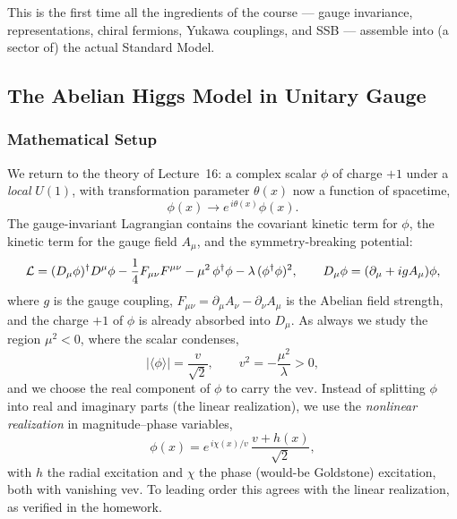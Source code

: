 This is the first time all the ingredients of the course --- gauge invariance, representations, chiral fermions, Yukawa couplings, and SSB --- assemble into (a sector of) the actual Standard Model.

\subsection{\texorpdfstring{The Abelian Higgs Model in Unitary Gauge}{The Abelian Higgs Model in Unitary Gauge}}\label{subsec:lec17:abelian-higgs}

\subsubsection*{Mathematical Setup}

We return to the theory of Lecture~16: a complex scalar $\phi$ of charge $+1$ under a \emph{local} $U(1)$, with transformation parameter $\theta(x)$ now a function of spacetime,
\begin{equation}
  \phi(x)\to e^{\,i\theta(x)}\phi(x) .
  \label{eq:lec17:u1_transformation}
\end{equation}
The gauge-invariant Lagrangian contains the covariant kinetic term for $\phi$, the kinetic term for the gauge field $A_\mu$, and the symmetry-breaking potential:
\begin{equation}
  \mathcal{L}
  =(D_\mu\phi)^\dagger D^\mu\phi
   -\frac14 F_{\mu\nu}F^{\mu\nu}
   -\mu^2\,\phi^\dagger\phi
   -\lambda\,(\phi^\dagger\phi)^2 ,
  \qquad
  D_\mu\phi=(\partial_\mu+i g A_\mu)\phi ,
  \label{eq:lec17:abelian_lagrangian}
\end{equation}
where $g$ is the gauge coupling, $F_{\mu\nu}=\partial_\mu A_\nu-\partial_\nu A_\mu$ is the Abelian field strength, and the charge $+1$ of $\phi$ is already absorbed into $D_\mu$. As always we study the region $\mu^2<0$, where the scalar condenses,
\begin{equation}
  |\langle\phi\rangle|=\frac{v}{\sqrt2},
  \qquad
  v^2=-\frac{\mu^2}{\lambda}>0 ,
  \label{eq:lec17:vev}
\end{equation}
and we choose the real component of $\phi$ to carry the vev. Instead of splitting $\phi$ into real and imaginary parts (the linear realization), we use the \emph{nonlinear realization} in magnitude--phase variables,
\begin{equation}
  \phi(x)=e^{\,i\chi(x)/v}\,\frac{v+h(x)}{\sqrt2} ,
  \label{eq:lec17:nonlinear}
\end{equation}
with $h$ the radial excitation and $\chi$ the phase (would-be Goldstone) excitation, both with vanishing vev. To leading order this agrees with the linear realization, as verified in the homework.

